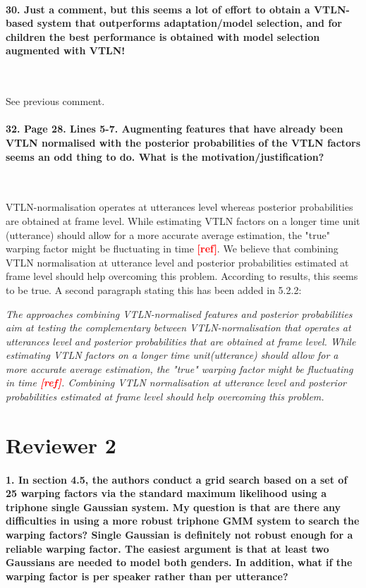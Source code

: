 \documentclass[]{article}
\begin{document}
\paragraph{30. Just a comment, but this seems a lot of effort to obtain a VTLN-based system that outperforms adaptation/model selection, and for children the best performance is obtained with model selection augmented with VTLN!}

~

See previous comment.

\paragraph{32. Page 28. Lines 5-7. Augmenting features that have already been VTLN normalised with the posterior probabilities of the VTLN factors seems an odd thing to do. What is the motivation/justification?}

~

VTLN-normalisation operates at utterances level whereas posterior probabilities are obtained at frame level. While estimating VTLN factors on a longer time unit (utterance) should allow for a more accurate average estimation, the "true" warping factor might be fluctuating in time \textbf{\textcolor{red}{[ref]}}. We believe that combining VTLN normalisation at utterance level and posterior probabilities estimated at frame level should help overcoming this problem. According to results, this seems to be true. A second paragraph stating this has been added in 5.2.2:

\textit{The approaches combining VTLN-normalised features and posterior probabilities aim at testing the complementary between VTLN-normalisation that operates at utterances level and posterior probabilities that are obtained at frame level. While estimating VTLN factors on a longer time unit(utterance) should allow for a more accurate average estimation, the "true" warping factor might be fluctuating in time \textbf{\textcolor{red}{[ref]}}. Combining VTLN normalisation at utterance level and posterior probabilities estimated at frame level should help overcoming this problem.}


\section{Reviewer 2}

\paragraph{1. In section 4.5, the authors conduct a grid search based on a set of 25 warping factors via the standard maximum likelihood using a triphone single Gaussian system. My question is that are there any difficulties in using a more robust triphone GMM system to search the warping factors? Single Gaussian is definitely not robust enough for a reliable warping factor. The easiest argument is that at least two Gaussians are needed to model both genders. In addition, what if the warping factor is per speaker rather than per utterance?}
\end{document}
